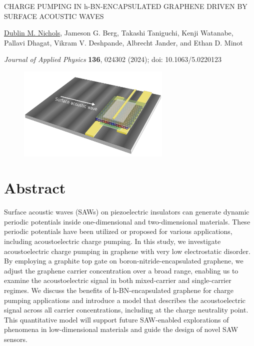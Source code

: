 \documentclass{beavtex_dub_edit}
\begin{document}
\clearpage

\thispagestyle{empty}
\mbox{}
\vspace{3cm}
\begin{center}
    {\large CHARGE PUMPING IN h-BN-ENCAPSULATED GRAPHENE DRIVEN BY SURFACE ACOUSTIC WAVES}
    \vspace{4cm}

    \underline{Dublin M. Nichols}, Jameson G. Berg, Takashi Taniguchi, Kenji Watanabe, Pallavi Dhagat, Vikram V. Deshpande, Albrecht Jander, and Ethan D. Minot
    \vspace{3cm}

    \textit{Journal of Applied Physics} \textbf{136}, 024302 (2024); doi: 10.1063/5.0220123
\end{center}

\pagebreak
\begin{figure}
    \includegraphics[width = 0.65\textwidth]{Highlight figure final v2.jpg}
\end{figure}

\section*{Abstract}
\thispagestyle{empty}
Surface acoustic waves (SAWs) on piezoelectric insulators can generate dynamic periodic potentials inside one-dimensional and two-dimensional materials. These periodic potentials have been utilized or proposed for various applications, including acoustoelectric charge pumping. In this study, we investigate acoustoelectric charge pumping in graphene with very low electrostatic disorder. By employing a graphite top gate on boron-nitride-encapsulated graphene, we adjust the graphene carrier concentration over a broad range, enabling us to examine the acoustoelectric signal in both mixed-carrier and single-carrier regimes. We discuss the benefits of h-BN-encapsulated graphene for charge pumping applications and introduce a model that describes the acoustoelectric signal across all carrier concentrations, including at the charge neutrality point. This quantitative model will support future SAW-enabled explorations of phenomena in low-dimensional materials and guide the design of novel SAW sensors.
\clearpage
\end{document}

